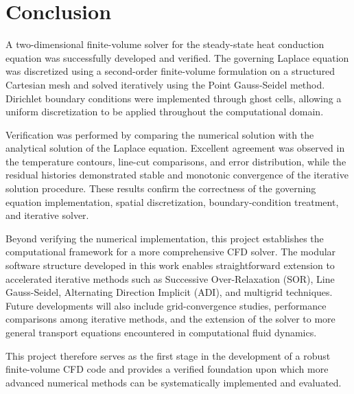 \section{Conclusion}

A two-dimensional finite-volume solver for the steady-state heat conduction equation was successfully developed and verified. The governing Laplace equation was discretized using a second-order finite-volume formulation on a structured Cartesian mesh and solved iteratively using the Point Gauss-Seidel method. Dirichlet boundary conditions were implemented through ghost cells, allowing a uniform discretization to be applied throughout the computational domain.

Verification was performed by comparing the numerical solution with the analytical solution of the Laplace equation. Excellent agreement was observed in the temperature contours, line-cut comparisons, and error distribution, while the residual histories demonstrated stable and monotonic convergence of the iterative solution procedure. These results confirm the correctness of the governing equation implementation, spatial discretization, boundary-condition treatment, and iterative solver.

Beyond verifying the numerical implementation, this project establishes the computational framework for a more comprehensive CFD solver. The modular software structure developed in this work enables straightforward extension to accelerated iterative methods such as Successive Over-Relaxation (SOR), Line Gauss-Seidel, Alternating Direction Implicit (ADI), and multigrid techniques. Future developments will also include grid-convergence studies, performance comparisons among iterative methods, and the extension of the solver to more general transport equations encountered in computational fluid dynamics.

This project therefore serves as the first stage in the development of a robust finite-volume CFD code and provides a verified foundation upon which more advanced numerical methods can be systematically implemented and evaluated.

